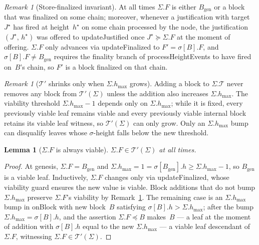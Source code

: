 \documentclass{article}
\newcommand{\genesis}{\ensuremath{B_{\mathrm{gen}}}}
\newcommand{\T}[0]{\ensuremath{\mathcal{T}}}
\newcommand{\hmax}{\ensuremath{h_{\max}}\xspace}
\newcommand{\viableTree}{\ensuremath{\mathcal{T}'}}
\newcommand{\processHeightEvents}{\textsf{processHeightEvents}\xspace}
\newcommand{\onBlock}{\textsf{onBlock}\xspace}
\newcommand{\updateJustified}{\textsf{updateJustified}\xspace}
\newcommand{\updateFinalized}{\textsf{updateFinalized}\xspace}
\theoremstyle{plain}
\newtheorem{lemma}{Lemma}
\theoremstyle{definition}
\theoremstyle{remark}
\newtheorem{remark}[theorem]{Remark}
\begin{document}
\begin{remark}[Store-finalized invariant]\label{rem:fs-invariant}
At all times $\Sigma.F$ is either $\genesis$ or a block that was finalized on some chain; moreover, whenever a justification with target~$J^\star$ has fired at height~$h^\star$ on some chain processed by the node, the justification $(J^\star,\, h^\star)$ was offered to \updateJustified once $J^\star \succeq \Sigma.F$ at the moment of offering.
$\Sigma.F$ only advances via \updateFinalized to $F' = \sigma[B].F$, and $\sigma[B].F \neq \genesis$ requires the finality branch of \processHeightEvents to have fired on~$B$'s chain, so $F'$ is a block finalized on that chain.
\end{remark}

\begin{remark}[$\viableTree$ shrinks only when $\Sigma.\hmax$ grows]\label{rem:viable-monotone}
Adding a block to $\Sigma.\T$ never removes any block from $\viableTree(\Sigma)$ unless the addition also increases $\Sigma.\hmax$.
The viability threshold $\Sigma.\hmax - 1$ depends only on $\Sigma.\hmax$; while it is fixed, every previously viable leaf remains viable and every previously viable internal block retains its viable leaf witness, so $\viableTree(\Sigma)$ can only grow.
Only an $\Sigma.\hmax$ bump can disqualify leaves whose $\sigma$-height falls below the new threshold.
\end{remark}

\begin{lemma}[$\Sigma.F$ is always viable]\label{lem:F-viable}
$\Sigma.F \in \viableTree(\Sigma)$ at all times.
\end{lemma}

\begin{proof}
At genesis, $\Sigma.F = \genesis$ and $\Sigma.\hmax = 1 = \sigma[\genesis].h \geq \Sigma.\hmax - 1$, so $\genesis$ is a viable leaf.
Inductively, $\Sigma.F$ changes only via \updateFinalized, whose viability guard ensures the new value is viable.
Block additions that do not bump $\Sigma.\hmax$ preserve $\Sigma.F$'s viability by Remark~\ref{rem:viable-monotone}.
The remaining case is an $\Sigma.\hmax$ bump in \onBlock with new block~$B$ satisfying $\sigma[B].h > \Sigma.\hmax$; after the bump $\Sigma.\hmax = \sigma[B].h$, and the assertion $\Sigma.F \preceq B$ makes~$B$ --- a leaf at the moment of addition with $\sigma[B].h$ equal to the new $\Sigma.\hmax$ --- a viable leaf descendant of~$\Sigma.F$, witnessing $\Sigma.F \in \viableTree(\Sigma)$.
\end{proof}
\end{document}
